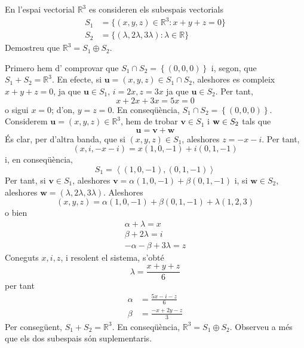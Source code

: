 \begin{exercici}
En l’espai vectorial $\mathbb{R}^{3}$ es consideren els subespais
vectorials%
\begin{align*}
S_{1} &=\{(x,y,z)\in \mathbb{R}^{3}:x+y+z=0\} \\
S_{2} &=\{(\lambda ,2\lambda ,3\lambda ):\lambda \in \mathbb{R}\}
\end{align*}%
Demostreu que $\mathbb{R}^{3}=S_{1}\oplus S_{2}$.

\end{exercici}
\begin{solucio}
Primero hem d’ comprovar que $S_{1}\cap S_{2}=\left\{
(0,0,0)\right\} $ i, segon, que $S_{1}+S_{2}=\mathbb{R}%
^{3}$. En efecte, si $\mathbf{u}=(x,y,z)\in S_{1}\cap S%
_{2} $, aleshores es compleix $x+y+z=0$, ja que $\mathbf{u}\in S_{1}$, $%
i=2x,z=3x$ ja que $\mathbf{u}\in S_{2}$. Per tant,%
\begin{equation*}
x+2x+3x=5x=0
\end{equation*}%
o sigui $x=0$; d’on, $y=z=0$. En conseqüència, $S_{1}\cap S_{2}=\left\{ (0,0,0)\right\} $. Considerem $\mathbf{u}=(x,y,z)\in
\mathbb{R}^{3}$, hem de trobar $\mathbf{v}\in S_{1}$ i $\mathbf{%
w}\in S_{2}$ tals que%
\begin{equation*}
\mathbf{u}=\mathbf{v}+\mathbf{w}
\end{equation*}%
És clar, per d’altra banda, que si $(x,y,z)\in S_{1}$, aleshores $%
z=-x-i$. Per tant,%
\begin{equation*}
(x,i,-x-i)=x(1,0,-1)+i(0,1,-1)
\end{equation*}%
i, en conseqüència,%
\begin{equation*}
S_{1}=\left\langle (1,0,-1),(0,1,-1)\right\rangle
\end{equation*}%
Per tant, si $\mathbf{v}\in S_{1}$, aleshores $\mathbf{v}=\alpha
(1,0,-1)+\beta (0,1,-1)$ i, si $\mathbf{w}\in S_{2}$, aleshores $%
\mathbf{w}=(\lambda ,2\lambda ,3\lambda )$. Aleshores%
\begin{equation*}
(x,y,z)=\alpha (1,0,-1)+\beta (0,1,-1)+\lambda (1,2,3)
\end{equation*}%
o bien%
\begin{equation*}
\begin{array}{r}
\alpha +\lambda =x \\
\beta +2\lambda =i \\
-\alpha -\beta +3\lambda =z%
\end{array}%
\end{equation*}%
Coneguts $x,i,z$, i resolent el sistema, s’obté%
\begin{equation*}
\lambda =\frac{x+y+z}{6}
\end{equation*}%
per tant%
\begin{align*}
\alpha &=\frac{5x-i-z}{6} \\
\beta &=\frac{-x+2y-z}{3}
\end{align*}%
Per consegüent, $S_{1}+S_{2}=\mathbb{R}^{3}$. En
conseqüència, $\mathbb{R}^{3}=S_{1}\oplus S_{2}$. Observeu a més que els dos subespais són suplementaris.
\end{solucio}

